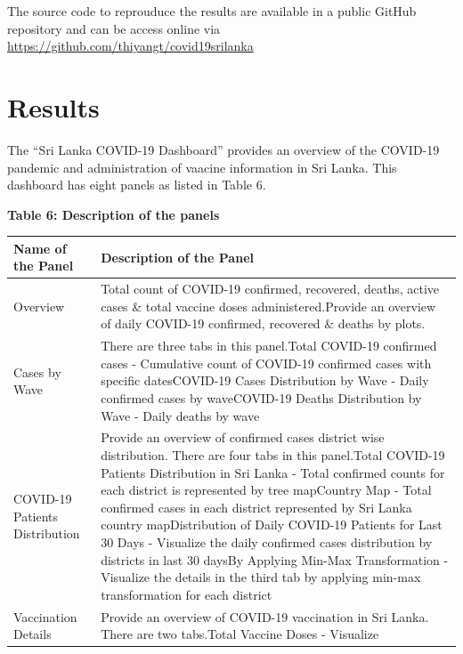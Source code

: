 \documentclass[
]{article}
\begin{document}
The source code to reprouduce the results are available in a public
GitHub repository and can be access online via
\url{https://github.com/thiyangt/covid19srilanka}

\hypertarget{results}{%
\section{Results}\label{results}}

The ``Sri Lanka COVID-19 Dashboard'' provides an overview of the
COVID-19 pandemic and administration of vaacine information in Sri
Lanka. This dashboard has eight panels as listed in Table 6.

\textbf{Table 6: Description of the panels}

\begin{longtable}[]{@{}
  >{\raggedright\arraybackslash}p{}
  >{\raggedright\arraybackslash}p{}@{}}
\toprule
\textbf{Name of the Panel} & \textbf{Description of the Panel} \\
\midrule
\endhead
Overview & Total count of COVID-19 confirmed, recovered, deaths, active
cases \& total vaccine doses administered.\hfill\break Provide an
overview of daily COVID-19 confirmed, recovered \& deaths by
plots.\hfill\break \\
Cases by Wave & There are three tabs in this panel.\hfill\break  * Total
COVID-19 confirmed cases - Cumulative count of COVID-19 confirmed cases
with specific dates\hfill\break * COVID-19 Cases Distribution by Wave -
Daily confirmed cases by wave\hfill\break * COVID-19 Deaths Distribution
by Wave - Daily deaths by wave\hfill\break \\
COVID-19 Patients Distribution & Provide an overview of confirmed cases
district wise distribution. There are four tabs in this
panel.\hfill\break * Total COVID-19 Patients Distribution in Sri Lanka -
Total confirmed counts for each district is represented by tree
map\hfill\break * Country Map - Total confirmed cases in each district
represented by Sri Lanka country map\hfill\break * Distribution of Daily
COVID-19 Patients for Last 30 Days - Visualize the daily confirmed cases
distribution by districts in last 30 days\hfill\break * By Applying
Min-Max Transformation - Visualize the details in the third tab by
applying min-max transformation for each district\hfill\break \\
Vaccination Details & Provide an overview of COVID-19 vaccination in Sri
Lanka. There are two tabs.\hfill\break * Total Vaccine Doses - Visualize

\end{longtable}
\end{document}
